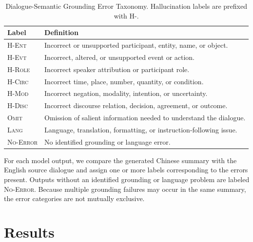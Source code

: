 \documentclass[11pt]{article}
\begin{document}
\begin{table}[t]
\centering
\footnotesize
\setlength{\tabcolsep}{3pt}
\begin{tabularx}{\columnwidth}{@{}lX@{}}
\hline
Label & Definition \\
\hline
\textsc{H-Ent}  & Incorrect or unsupported participant, entity, name, or object. \\
\textsc{H-Evt}  & Incorrect, altered, or unsupported event or action. \\
\textsc{H-Role} & Incorrect speaker attribution or participant role. \\
\textsc{H-Circ} & Incorrect time, place, number, quantity, or condition. \\
\textsc{H-Mod}  & Incorrect negation, modality, intention, or uncertainty. \\
\textsc{H-Disc} & Incorrect discourse relation, decision, agreement, or outcome. \\
\textsc{Omit}   & Omission of salient information needed to understand the dialogue. \\
\textsc{Lang}   & Language, translation, formatting, or instruction-following issue. \\
\textsc{No-Error} & No identified grounding or language error. \\
\hline
\end{tabularx}
\caption{Dialogue-Semantic Grounding Error Taxonomy. Hallucination labels are prefixed with \textsc{H-}.}
\label{tab:taxonomy}
\end{table}

For each model output, we compare the generated Chinese summary with the English source dialogue and assign one or more labels corresponding to the errors present. Outputs without an identified grounding or language problem are labeled \textsc{No-Error}. Because multiple grounding failures may occur in the same summary, the error categories are not mutually exclusive.

\FloatBarrier

\section{Results}
\end{document}
